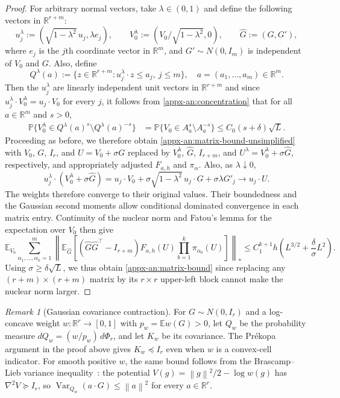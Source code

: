 \documentclass[11pt,letterpaper]{article}
\theoremstyle{remark}
\newtheorem{remark}{Remark}
\newcommand{\E}{\mathbb E}
\newcommand{\R}{\mathbb R}
\newcommand{\norm}[1]{\left\lVert#1\right\rVert}
\begin{document}
\begin{proof}
For arbitrary normal vectors, take \(\lambda\in(0,1)\) and define the following vectors in $\R^{r+m}$:
\[
 u_j^\lambda:=(\sqrt{1-\lambda^2}\,u_j,\lambda e_j),\qquad
 V_0^\lambda:=(V_0/\sqrt{1-\lambda^2},0),\qquad
 \widehat G:=(G,G'),
\]
where \(e_j\) is the \(j\)th coordinate vector in \(\R^m\), and
\(G'\sim N(0,I_m)\) is independent of $V_0$ and $G$. Also, define
\[
Q^\lambda(a):=\{z\in\mathbb R^{r+m}:u_j^\lambda\cdot z\le a_j,\ j\le m\},\quad a=(a_1,\dots,a_m)\in\R^m.
\]
Then the \(u_j^\lambda\) are linearly independent unit vectors in $\R^{r+m}$ and
since \(u_j^\lambda\cdot V_0^\lambda=u_j\cdot V_0\) for every \(j\), it follows from \eqref{appx-an:concentration} that for all \(a\in\mathbb R^m\) and \(s>0\),
\[
\begin{aligned}
\mathbb P\{V_0^\lambda\in Q^\lambda(a)^s\setminus Q^\lambda(a)^{-s}\}
&=\mathbb P\{V_0\in A_a^s\setminus A_a^{-s}\} \le C_0(s+\delta)\sqrt L.
\end{aligned}
\]
Proceeding as before, we therefore obtain \eqref{appx-an:matrix-bound-unsimplified} with $V_0$, $G$, $I_r$, and $U=V_0+\sigma G$ replaced by $V_0^{\lambda}$, $\widehat G$, $I_{r+m}$, and $U^{\lambda} = V_0^{\lambda} + \sigma \widehat G$, respectively, and appropriately adjusted $F_{a, h}$ and $\pi_{\alpha}$. Also, as \(\lambda\downarrow0\),
\[
 u_j^\lambda\cdot(V_0^\lambda+\sigma\widehat G)
 =u_j\cdot V_0+\sigma\sqrt{1-\lambda^2}\,u_j\cdot G
                  +\sigma\lambda G'_j
 \longrightarrow u_j\cdot U.
\]
The weights therefore converge to their original values. Their
boundedness and the Gaussian second moments allow conditional dominated
convergence in each matrix entry. Continuity of the nuclear norm and
Fatou's lemma for the expectation over $V_0$ then give
\[
 \E_{V_0}\sum_{\alpha_1,\ldots,\alpha_k=1}^m
 \left\|\E_{\widehat G}\left[(\widehat G\widehat G^\top-I_{r+m})F_{a, h}(U)
              \prod_{b=1}^k\pi_{\alpha_b}(U)\right]\right\|_*
 \le C_1^{k+1}h\left(L^{3/2}+\frac\delta\sigma L^2\right).
\]
Using \(\sigma\ge\delta\sqrt L\), we thus obtain \eqref{appx-an:matrix-bound} since replacing any $(r+m)\times(r+m)$ matrix by its $r\times r$ upper-left block cannot make the nuclear norm larger.
\par\endgroup
\end{proof}

\begin{remark}[Gaussian covariance contraction]\label{appx-rem:covariance-contraction}
For \(G\sim N(0,I_r)\) and a log-concave weight \(w:\R^r\to[0,1]\) with
\(p_w=\E w(G)>0\), let \(Q_w\) be the probability measure
\(dQ_w=(w/p_w)\,d\Phi_r\), and let \(K_w\) be its covariance.
The Pr\'ekopa argument in the proof above gives \(K_w\preceq I_r\)
even when \(w\) is a convex-cell indicator. For smooth positive
\(w\), the same bound follows from the Brascamp--Lieb variance
inequality~\cite{BrascampLieb1976}: the potential
\(V(g)=\norm g^2/2-\log w(g)\) has \(\nabla^2V\succeq I_r\),
so \(\operatorname{Var}_{Q_w}(a\cdot G)\le\norm a^2\) for every
\(a\in\R^r\).
\end{remark}
\end{document}
